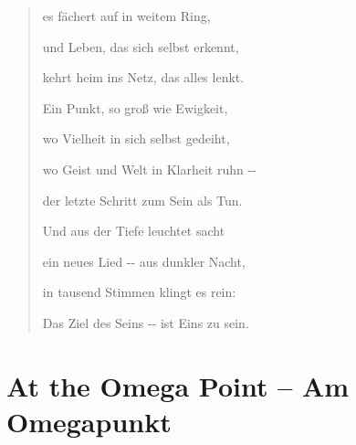 \documentclass[
  ngerman,
]{article}
\begin{document}
\begin{quote}
es fächert auf in weitem Ring,

und Leben, das sich selbst erkennt,

kehrt heim ins Netz, das alles lenkt.

Ein Punkt, so groß wie Ewigkeit,

wo Vielheit in sich selbst gedeiht,

wo Geist und Welt in Klarheit ruh\textquotesingle n -\/-

der letzte Schritt zum Sein als Tun.

Und aus der Tiefe leuchtet sacht

ein neues Lied -\/- aus dunkler Nacht,

in tausend Stimmen klingt es rein:

Das Ziel des Seins -\/- ist Eins zu sein.
\end{quote}

\section{\texorpdfstring{\textbf{At the Omega Point -- Am
Omegapunkt}}{At the Omega Point -- Am Omegapunkt}}\label{at-the-omega-point-am-omegapunkt}
\end{document}
